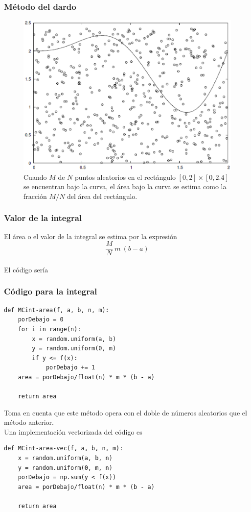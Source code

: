 \begin{frame}
\frametitle{Método del dardo}
\begin{figure}
	\centering
	\includegraphics[scale=0.4]{Imagenes/integracionCaja.eps}
	\caption{\tiny{Cuando $M$ de $N$ puntos aleatorios en el rectángulo $[0, 2] \times [0, 2.4]$ se encuentran bajo la curva, el área bajo la curva se estima como la fracción $M / N$ del área del rectángulo.}}
\end{figure}
\end{frame}
\begin{frame}
\frametitle{Valor de la integral}
El área o el valor de la integral se estima por la expresión
\[ \dfrac{M}{N} \: m \: (b - a) \]
\\
\bigskip
El código sería
\end{frame}
\begin{frame}
\frametitle{Código para la integral}
\begin{lstlisting}[caption=Código para el método del daro, style=FormattedNumber, basicstyle=\linespread{1.1}\ttfamily=\small, columns=fullflexible]
def MCint-area(f, a, b, n, m):
    porDebajo = 0 
    for i in range(n):
        x = random.uniform(a, b)
        y = random.uniform(0, m)
        if y <= f(x):
            porDebajo += 1
    area = porDebajo/float(n) * m * (b - a)
    
    return area
\end{lstlisting}
\end{frame}
\begin{frame}[fragile]
Toma en cuenta que este método opera con el doble de números aleatorios que el método anterior.
\\
\bigskip
Una implementación vectorizada del código es
\begin{lstlisting}[caption=Método del dardo en modo vectorizado, style=FormattedNumber, basicstyle=\linespread{1.1}\ttfamily=\small, columns=fullflexible]
def MCint-area-vec(f, a, b, n, m):
    x = random.uniform(a, b, n)
    y = random.uniform(0, m, n)
    porDebajo = np.sum(y < f(x))
    area = porDebajo/float(n) * m * (b - a)
    
    return area
\end{lstlisting}
\end{frame}
